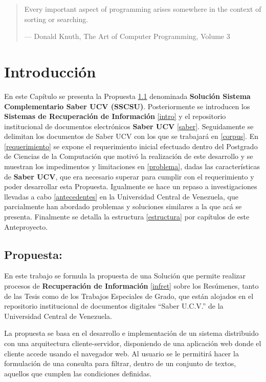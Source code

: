 \documentclass[
  10,
  spanish,
  openany]{book}
\begin{document}
\begin{quote}
Every important aspect of programming arises somewhere in the context of sorting or searching.

--- Donald Knuth, The Art of Computer Programming, Volume 3
\end{quote}

\hypertarget{introduccion}{%
\chapter{Introducción}\label{introduccion}}

En este Capítulo se presenta la Propuesta \ref{propuesta} denominada \textbf{Solución Sistema Complementario Saber UCV (SSCSU)}. Posteriormente se introducen los \textbf{Sistemas de Recuperación de Información} \ref{intro} y el repositorio institucional de documentos electrónicos \textbf{Saber UCV} \ref{saber}. Seguidamente se delimitan los documentos de Saber UCV con los que se trabajará en \ref{corpus}. En \ref{requerimiento} se expone el requerimiento inicial efectuado dentro del Postgrado de Ciencias de la Computación que motivó la realización de este desarrollo y se muestran los impedimentos y limitaciones en \ref{problema}, dadas las características de \textbf{Saber UCV}, que era necesario superar para cumplir con el requerimiento y poder desarrollar esta Propuesta. Igualmente se hace un repaso a investigaciones llevadas a cabo \ref{antecedentes} en la Universidad Central de Venezuela, que parcialmente han abordado problemas y soluciones similares a la que acá se presenta. Finalmente se detalla la estructura \ref{estructura} por capítulos de este Anteproyecto.

\hypertarget{propuesta}{%
\section{Propuesta:}\label{propuesta}}

En este trabajo se formula la propuesta de una Solución que permite realizar procesos de \textbf{Recuperación de Información} \ref{infret} sobre los Resúmenes, tanto de las Tesis como de los Trabajos Especiales de Grado, que están alojados en el repositorio institucional de documentos digitales ``Saber U.C.V.'' de la Universidad Central de Venezuela.

La propuesta se basa en el desarrollo e implementación de un sistema distribuido con una arquitectura cliente-servidor, disponiendo de una aplicación web donde el cliente accede usando el navegador web. Al usuario se le permitirá hacer la formulación de una consulta para filtrar, dentro de un conjunto de textos, aquellos que cumplen las condiciones definidas.
\end{document}
